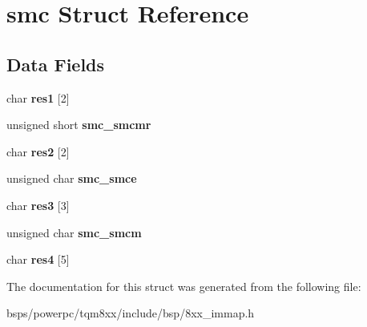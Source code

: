 \hypertarget{structsmc}{}\section{smc Struct Reference}
\label{structsmc}
\subsection*{Data Fields}
\begin{DoxyCompactItemize}
\item 
\mbox{\label{structsmc_ab7fbf94d3f0fce7c1002419ba9b5b567}} 
char {\bfseries res1} \mbox{[}2\mbox{]}
\item 
\mbox{\label{structsmc_ae4957ad5c03aeda887d3f6901621b832}} 
unsigned short {\bfseries smc\+\_\+smcmr}
\item 
\mbox{\label{structsmc_aa199e60a10f3dbcfe3065575bcc810a1}} 
char {\bfseries res2} \mbox{[}2\mbox{]}
\item 
\mbox{\label{structsmc_aa62a97db182f0e0823c7ce25171d5181}} 
unsigned char {\bfseries smc\+\_\+smce}
\item 
\mbox{\label{structsmc_a9c2e6332d7ac7fabcbc4759570c1e792}} 
char {\bfseries res3} \mbox{[}3\mbox{]}
\item 
\mbox{\label{structsmc_ad2ed34c7c696f68264ef5a6f81a214a7}} 
unsigned char {\bfseries smc\+\_\+smcm}
\item 
\mbox{\label{structsmc_a15313bbbce33b275be70f6848ebbe232}} 
char {\bfseries res4} \mbox{[}5\mbox{]}
\end{DoxyCompactItemize}


The documentation for this struct was generated from the following file\+:\begin{DoxyCompactItemize}
\item 
bsps/powerpc/tqm8xx/include/bsp/8xx\+\_\+immap.\+h\end{DoxyCompactItemize}
